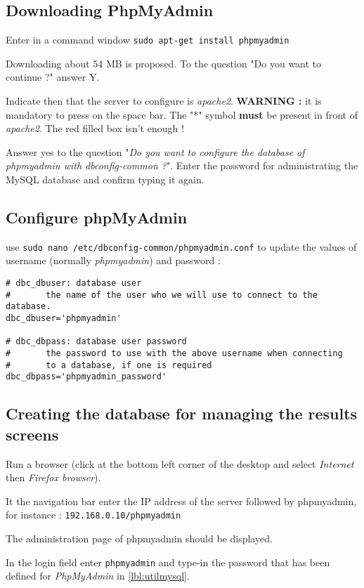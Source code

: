 \documentclass[a4paper]{ffco-rapport}
\begin{document}
	\subsection{Downloading PhpMyAdmin}
		Enter in a command window \verb|sudo apt-get install phpmyadmin|
		
		Downloading about 54 MB is proposed. To the question "Do you want to continue ?" answer Y.

		Indicate then that the server to configure is \emph{apache2}.
		{\bfseries WARNING : } it is mandatory to press on the space bar.
		The "*" symbol {\bfseries must} be present in front of \emph{apache2}.
		The red filled box isn't enough !
		
		Answer yes to the question "\emph{Do you want to configure the database of phpmyadmin with dbconfig-common ?}". Enter the password for administrating the MySQL database and confirm typing it again.

	\subsection{Configure phpMyAdmin}
			use \verb|sudo nano /etc/dbconfig-common/phpmyadmin.conf| to update the values of username (normally \emph{phpmyadmin}) and password :


			\begin{verbatim}
# dbc_dbuser: database user
#       the name of the user who we will use to connect to the database.
dbc_dbuser='phpmyadmin'

# dbc_dbpass: database user password
#       the password to use with the above username when connecting
#       to a database, if one is required
dbc_dbpass='phpmyadmin_password'
			\end{verbatim}
	
		\subsection{Creating the database for managing the results screens}
			Run a browser (click at the bottom left corner of the desktop and select \emph{Internet} then \emph{Firefox browser}).

			It the navigation bar enter the IP address of the server followed by phpmyadmin, for instance :  \verb|192.168.0.10/phpmyadmin|

			The administration page of phpmyadmin should be displayed.
			
			In the login field enter \verb|phpmyadmin| and type-in the password that has been defined for \emph{PhpMyAdmin} in \ref{lbl:utilmysql}.
			
\end{document}
